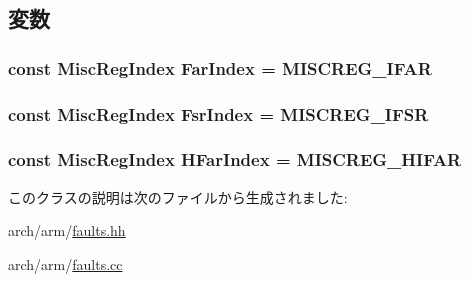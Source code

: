 \subsection{変数}
\hypertarget{classArmISA_1_1PrefetchAbort_a3c751f200a61047c7edace6f38db43aa}{
\subsubsection[{FarIndex}]{\setlength{\rightskip}{0pt plus 5cm}const {\bf MiscRegIndex} {\bf FarIndex} = MISCREG\_\-IFAR}}
\label{classArmISA_1_1PrefetchAbort_a3c751f200a61047c7edace6f38db43aa}
\hypertarget{classArmISA_1_1PrefetchAbort_a0fc945049ae4ebc86b2c2765b65ab5c8}{
\subsubsection[{FsrIndex}]{\setlength{\rightskip}{0pt plus 5cm}const {\bf MiscRegIndex} {\bf FsrIndex} = MISCREG\_\-IFSR}}
\label{classArmISA_1_1PrefetchAbort_a0fc945049ae4ebc86b2c2765b65ab5c8}
\hypertarget{classArmISA_1_1PrefetchAbort_adf1eccd205afd5770084542cc2295d6c}{
\subsubsection[{HFarIndex}]{\setlength{\rightskip}{0pt plus 5cm}const {\bf MiscRegIndex} {\bf HFarIndex} = MISCREG\_\-HIFAR}}
\label{classArmISA_1_1PrefetchAbort_adf1eccd205afd5770084542cc2295d6c}


このクラスの説明は次のファイルから生成されました:\begin{DoxyCompactItemize}
\item 
arch/arm/\hyperlink{arch_2arm_2faults_8hh}{faults.hh}\item 
arch/arm/\hyperlink{arch_2arm_2faults_8cc}{faults.cc}\end{DoxyCompactItemize}
